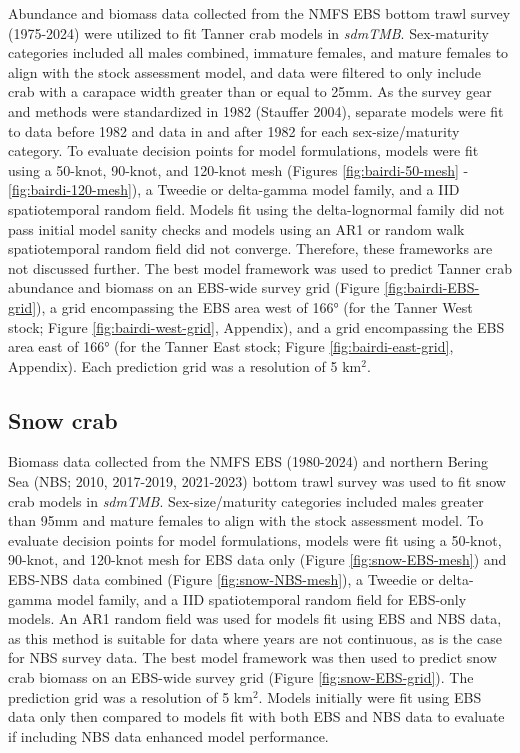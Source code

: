 \documentclass[
]{article}
\begin{document}
Abundance and biomass data collected from the NMFS EBS bottom trawl survey (1975-2024) were utilized to fit Tanner crab models in \emph{sdmTMB}. Sex-maturity categories included all males combined, immature females, and mature females to align with the stock assessment model, and data were filtered to only include crab with a carapace width greater than or equal to 25mm. As the survey gear and methods were standardized in 1982 (Stauffer 2004), separate models were fit to data before 1982 and data in and after 1982 for each sex-size/maturity category. To evaluate decision points for model formulations, models were fit using a 50-knot, 90-knot, and 120-knot mesh (Figures \ref{fig:bairdi-50-mesh} - \ref{fig:bairdi-120-mesh}), a Tweedie or delta-gamma model family, and a IID spatiotemporal random field. Models fit using the delta-lognormal family did not pass initial model sanity checks and models using an AR1 or random walk spatiotemporal random field did not converge. Therefore, these frameworks are not discussed further. The best model framework was used to predict Tanner crab abundance and biomass on an EBS-wide survey grid (Figure \ref{fig:bairdi-EBS-grid}), a grid encompassing the EBS area west of 166° (for the Tanner West stock; Figure \ref{fig:bairdi-west-grid}, Appendix), and a grid encompassing the EBS area east of 166° (for the Tanner East stock; Figure \ref{fig:bairdi-east-grid}, Appendix). Each prediction grid was a resolution of 5 km\(^2\).

\subsection*{Snow crab}\label{snow-crab}

Biomass data collected from the NMFS EBS (1980-2024) and northern Bering Sea (NBS; 2010, 2017-2019, 2021-2023) bottom trawl survey was used to fit snow crab models in \emph{sdmTMB}. Sex-size/maturity categories included males greater than 95mm and mature females to align with the stock assessment model. To evaluate decision points for model formulations, models were fit using a 50-knot, 90-knot, and 120-knot mesh for EBS data only (Figure \ref{fig:snow-EBS-mesh}) and EBS-NBS data combined (Figure \ref{fig:snow-NBS-mesh}), a Tweedie or delta-gamma model family, and a IID spatiotemporal random field for EBS-only models. An AR1 random field was used for models fit using EBS and NBS data, as this method is suitable for data where years are not continuous, as is the case for NBS survey data. The best model framework was then used to predict snow crab biomass on an EBS-wide survey grid (Figure \ref{fig:snow-EBS-grid}). The prediction grid was a resolution of 5 km\(^2\). Models initially were fit using EBS data only then compared to models fit with both EBS and NBS data to evaluate if including NBS data enhanced model performance.
\end{document}
